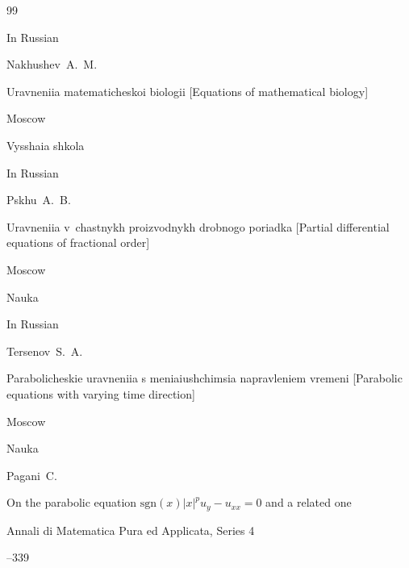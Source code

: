 \begin{thebibliography}{99}






\lang In Russian

\by  Nakhushev~A.~M.

\book Uravneniia matematicheskoi biologii \rm [Equations of mathematical biology]

\publaddr Moscow

\publ Vysshaia shkola






\lang In Russian

\by Pskhu~A.~B.

\book Uravneniia v~chastnykh proizvodnykh drobnogo poriadka \rm [Partial differential equations of fractional order]

\publaddr Moscow

\publ Nauka








\lang In Russian

\by Tersenov~S.~A.

\book Parabolicheskie uravneniia s meniaiushchimsia napravleniem vremeni \rm [Parabolic equations with varying time direction]

\publaddr Moscow

\publ Nauka








\by Pagani~C.

\paper On the parabolic equation  $\text{sgn}(x)|x|^{p}u_y-u_{xx}=0$ and a related one

\jour Annali di Matematica Pura ed Applicata, Series 4 




--339


\end{thebibliography}
